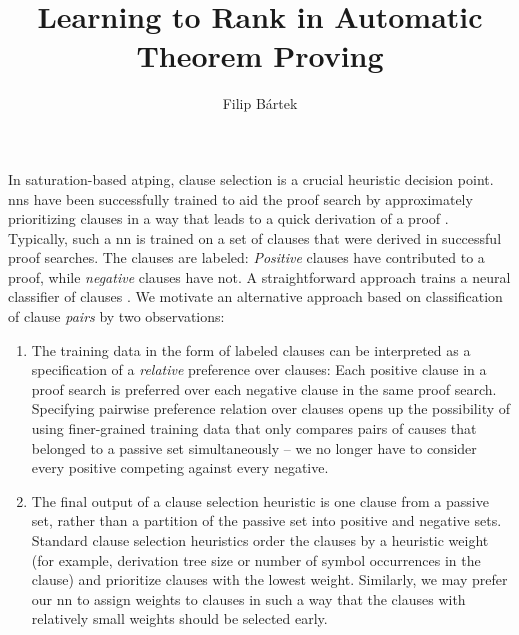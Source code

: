 \documentclass{easychair}
\title{Learning to Rank in Automatic Theorem Proving}
\author{Filip Bártek}
\institute{\href{https://www.cvut.cz/}{\acrlong{ctu}}, Czech Republic\\
\email{filip.bartek@cvut.cz}}
\begin{document}
\maketitle

In saturation-based \gls{atping},
clause selection is a crucial heuristic decision point.
\Glspl{nn} have been successfully trained to aid the proof search by approximately prioritizing clauses
in a way that leads to a quick derivation of a proof \cite{DBLP:conf/lpar/Bartek023,DBLP:conf/cade/JakubuvCOP0U20,DBLP:conf/cade/ChvalovskyJ0U19,DBLP:conf/cade/000121a,DBLP:conf/lpar/ChvalovskyKPU23}.
Typically, such a \gls{nn} is trained on a set of clauses that were derived in successful proof searches.
The clauses are labeled: \emph{Positive} clauses have contributed to a proof, while \emph{negative} clauses have not.
A straightforward approach trains a neural classifier of clauses \cite{DBLP:conf/cade/JakubuvCOP0U20,DBLP:conf/cade/000121a}.
We motivate an alternative approach based on classification of clause \emph{pairs} by two observations:

\begin{enumerate}
\item
The training data in the form of labeled clauses
can be interpreted as a specification of a \emph{relative} preference over clauses:
Each positive clause in a proof search is preferred over each negative clause in the same proof search.
Specifying pairwise preference relation over clauses opens up the possibility of using finer-grained training data
that only compares pairs of causes that belonged to a passive set simultaneously --
we no longer have to consider every positive competing against every negative.

\item
The final output of a clause selection heuristic is one clause from a passive set,
rather than a partition of the passive set into positive and negative sets.
Standard clause selection heuristics order the clauses by a heuristic weight
(for example, derivation tree size or number of symbol occurrences in the clause)
and prioritize clauses with the lowest weight.
Similarly, we may prefer our \gls{nn} to assign weights to clauses in such a way that
the clauses with relatively small weights should be selected early.
\end{enumerate}
\end{document}

